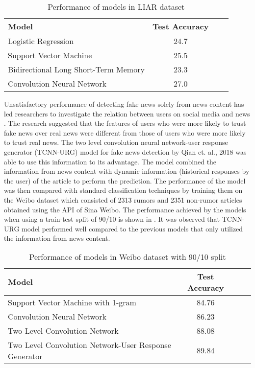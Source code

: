 \begin{table}[h]
\begin{center}
\caption{Performance of models in LIAR dataset}
\label{tbl:liar_performance}
\begin{tabular}{lccc}
\toprule 
Model&Test Accuracy\\
\midrule 
Logistic Regression&24.7\\
Support Vector Machine&25.5\\
Bidirectional Long Short-Term Memory&23.3\\
Convolution Neural Network&27.0\\
\bottomrule
\end{tabular}
\end{center}
\end{table}

Unsatisfactory performance of detecting fake news solely from news content has led researchers to investigate the relation between users on social media and news \cite{shu2018understanding}. The research suggested that the features of users who were more likely to trust fake news over real news were different from those of users who were more likely to trust real news. The two level convolution neural network-user response generator (TCNN-URG) model for fake news detection by Qian et. al., 2018 was able to use this information to its advantage. The model combined the information from news content with dynamic information (historical responses by the user) of the article to perform the prediction. The performance of the model was then compared with standard classification techniques by training them on the Weibo dataset\cite{ma2016detecting} which consisted of 2313 rumors and 2351 non-rumor articles obtained using the API of Sina Weibo. The performance achieved by the models when using a train-test split of 90/10 is shown in  \cite{qian2018neural}. It was observed that TCNN-URG model performed well compared to the previous models that only utilized the information from news content.

\begin{table}[h]
\begin{center}
\caption{Performance of models in Weibo dataset with 90/10 split}
\label{tbl:weibo_performance}
\begin{tabular}{lccc}
\toprule 
\rule[-1pt]{0pt}{14pt}Model&Test Accuracy\\
\midrule 
Support Vector Machine with 1-gram&84.76\\
Convolution Neural Network&86.23\\
Two Level Convolution Network&88.08\\
Two Level Convolution Network-User Response Generator&89.84\\
\bottomrule
\end{tabular}
\end{center}
\end{table}


